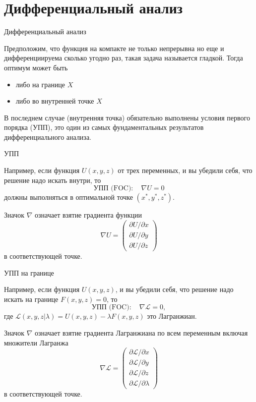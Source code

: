 \documentclass{beamer}
\begin{document}
\section{Дифференциальный анализ}

\begin{frame}{Дифференциальный анализ}

Предположим, что функция на компакте не только непрерывна но еще и дифференциируема сколько угодно раз, такая задача называется \alert{гладкой}. Тогда оптимум может быть

\begin{itemize}
  \item либо на границе $X$
  \item либо во внутренней точке $X$
\end{itemize}

В последнем случае (внутренняя точка) обязательно выполнены \alert{условия первого порядка} (УПП), это один из самых фундаментальных результатов дифференциального анализа.

\end{frame}

\begin{frame}{УПП}

Например, если функция $U(x, y, z)$ от трех переменных, и вы убедили себя, что решение надо искать внутри, то
$$\text{УПП (FOC)}: \quad  \nabla U = 0$$ 
должны выполняться в оптимальной точке $(x^{\ast}, y^{\ast}, z^{\ast})$. 

Значок $\nabla$ означает взятие градиента функции $$ \nabla U = \begin{pmatrix} \partial U/\partial x \\ \partial U/\partial y \\ \partial U/\partial z \end{pmatrix}$$
в соответствующей точке.

\end{frame}

\begin{frame}{УПП на границе}

Например, если функция $U(x, y, z)$, и вы убедили себя, что решение надо искать на границе $F(x,y,z) = 0$, то
$$\text{УПП (FOC)}: \quad  \nabla \mathcal{L} = 0, $$ 
где $\mathcal{L}(x,y,z|\lambda) = U(x, y, z) - \lambda F(x,y,z)$ это \alert{Лагранжиан}.

Значок $\nabla$ означает взятие градиента Лагранжиана по всем переменным включая множители Лагранжа $$ \nabla \mathcal{L} = \begin{pmatrix} \partial \mathcal{L}/\partial x \\ \partial \mathcal{L}/\partial y \\ \partial \mathcal{L}/\partial z \\ \partial \mathcal{L}/\partial \lambda \end{pmatrix}$$
в соответствующей точке.

\end{frame}
\end{document}
